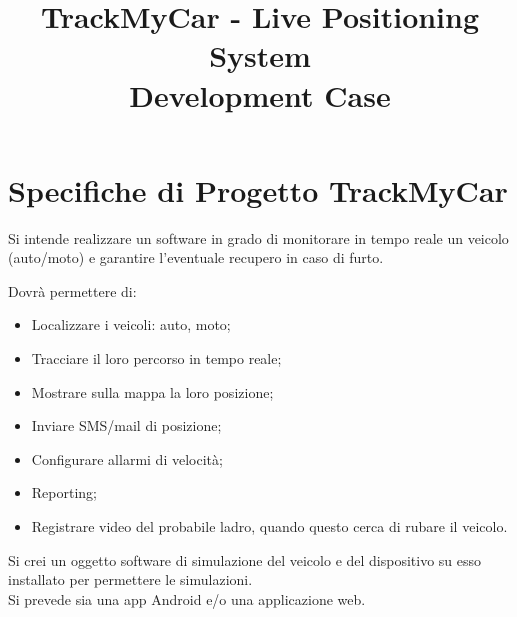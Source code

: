 \documentclass[a4paper,12pt]{article}
\begin{document}
\title{\textbf{TrackMyCar - Live Positioning System} \\ Development Case}
\maketitle

\section{Specifiche di Progetto TrackMyCar}
Si intende realizzare un software in grado di monitorare in tempo reale un veicolo (auto/moto) e garantire l’eventuale recupero in caso di furto.

Dovrà permettere di:
\begin{itemize}
\item Localizzare i veicoli: auto, moto;
\item Tracciare il loro percorso in tempo reale;
\item Mostrare sulla mappa la loro posizione;
\item Inviare SMS/mail di posizione;
\item Configurare allarmi di velocità;
\item Reporting;
\item Registrare video del probabile ladro, quando questo cerca di rubare il veicolo.
\end{itemize}
Si crei un oggetto software di simulazione del veicolo e del dispositivo su esso installato per permettere le simulazioni.\\
Si prevede sia una app Android e/o una applicazione web.
\end{document}
